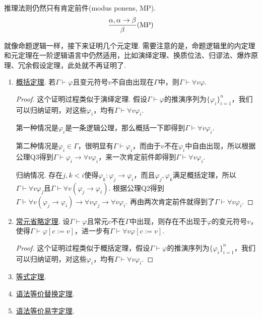 推理法则仍然只有肯定前件(modus ponens, MP).
\[{{\alpha, \alpha \to \beta} \over {\beta}} ({\rm MP})\]

就像命题逻辑一样，接下来证明几个元定理. 需要注意的是，命题逻辑里的内定理和元定理在一阶逻辑语言中仍然适用，比如演绎定理、换质位法、归谬法、爆炸原理、冗余假设定理，此处就不再证明了.

\begin{enumerate}
    \item \underline{概括定理}. 若$\Gamma \vdash \varphi$且变元符号$v$不自由出现在$\Gamma$中，则$\Gamma \vdash \forall v \varphi$.
    \begin{proof}
        这个证明过程类似于演绎定理. 假设$\Gamma \vdash \varphi$的推演序列为$\{\varphi_i\}_{i=1}^n$，我们可以归纳证明，对这些$\varphi_i$，均有$\Gamma \vdash \forall v \varphi_i$. 
        
        第一种情况是$\varphi_i$是一条逻辑公理，那么概括一下即得到$\Gamma \vdash \forall v \varphi_i$.

        第二种情况是$\varphi_i \in \Gamma$，很明显有$\Gamma \vdash \varphi_i$，而由于$v$不在$\varphi_i$中自由出现，所以根据公理Q3得到$\Gamma \vdash \varphi_i \to \forall v \varphi_i$，来一次肯定前件即得到$\Gamma \vdash \forall v \varphi_i$.

        归纳情况. 存在$j,k<i$使得$\varphi_k: \varphi_j \to \varphi_i$，而且$\varphi_j,\varphi_k$满足概括定理，所以$\Gamma \vdash \forall v \varphi_j$且$\Gamma \vdash \forall v(\varphi_j \to \varphi_i)$. 根据公理Q2得到$\Gamma \vdash \forall v(\varphi_j \to \varphi_i) \to \forall v \varphi_j \to \forall v \varphi_i$. 再由两次肯定前件就得到了$\Gamma \vdash \forall v \varphi_i$.
    \end{proof}

    \item \underline{常元省略定理}. 设$\Gamma \vdash \varphi$且常元$c$不在$\Gamma$中出现，则存在不出现于$\varphi$的变元符号$v$，使得$\Gamma \vdash \varphi[c:=v]$，进一步有$\Gamma \vdash \forall v \varphi[c:=v]$.
    \begin{proof}
        这个证明过程类似于概括定理，假设$\Gamma \vdash \varphi$的推演序列为$\{\varphi_i\}_{i=1}^n$，我们可以归纳证明，对这些$\varphi_i$，均有$\Gamma \vdash \forall v \varphi_i$. 
    \end{proof}

    \item \underline{等式定理}.
    \item \underline{语法等价替换定理}. 
    \item \underline{语法等价易字定理}.
\end{enumerate}
